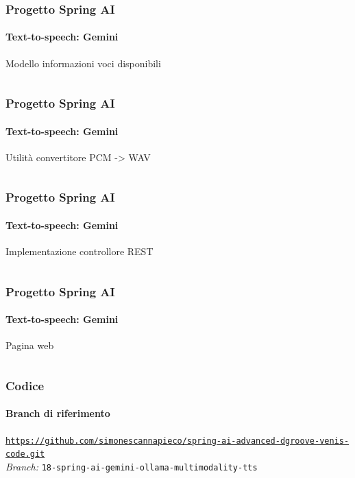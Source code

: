 %
\begin{frame}[t,fragile] \frametitle{Progetto Spring AI}
    \framesubtitle{Text-to-speech: Gemini}
        \begin{block}{Modello informazioni voci disponibili}
			{\tiny\inputminted{java}{code/VoiceInfo.java}}
    	\end{block}
\end{frame}
%
\begin{frame}[t,fragile] \frametitle{Progetto Spring AI}
    \framesubtitle{Text-to-speech: Gemini}
    	\vspace*{-.7cm}
        \begin{block}{Utilità convertitore PCM -> WAV}
			{\tiny\inputminted{java}{code/PcmToWavConverter.java}}
    	\end{block}
\end{frame}
%
\begin{frame}[t,fragile] \frametitle{Progetto Spring AI}
    \framesubtitle{Text-to-speech: Gemini}
    	\vspace*{-.7cm}
        \begin{block}{Implementazione controllore REST}
			{\tiny\inputminted{java}{code/GeminiMultimodalityController.java}}
    	\end{block}
\end{frame}
%
\begin{frame}[t,fragile] \frametitle{Progetto Spring AI}
    \framesubtitle{Text-to-speech: Gemini}
    	\vspace*{-.7cm}
        \begin{block}{Pagina web}
			{\tiny\inputminted{html}{code/gemini-tts.html}}
    	\end{block}
\end{frame}
%
\begin{frame}[fragile] \frametitle{Codice}
    \framesubtitle{Branch di riferimento}
	\begin{center}
		{\scriptsize \href{https://github.com/simonescannapieco/spring-ai-advanced-dgroove-venis-code.git}{\texttt{https://github.com/simonescannapieco/spring-ai-advanced-dgroove-venis-code.git}}}\\
		\textit{Branch:} \alert{\texttt{18-spring-ai-gemini-ollama-multimodality-tts}}
	\end{center}
\end{frame}
